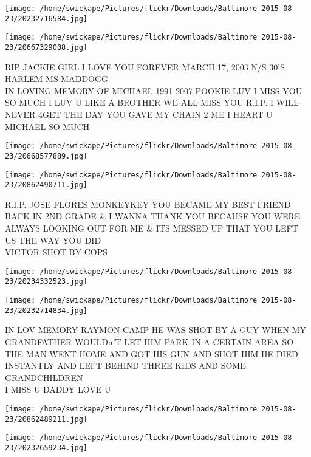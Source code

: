 \documentclass[10pt,letterpaper]{article}
\begin{document}
\texttt{[image: /home/swickape/Pictures/flickr/Downloads/Baltimore 2015-08-23/20232716584.jpg]}

\vspace{0.25in}
\texttt{[image: /home/swickape/Pictures/flickr/Downloads/Baltimore 2015-08-23/20667329008.jpg]}

RIP JACKIE GIRL I LOVE YOU FOREVER MARCH 17, 2003 N/S 30'S HARLEM MS MADDOGG\\
IN LOVING MEMORY OF MICHAEL 1991{-}2007 POOKIE LUV I MISS YOU SO MUCH I LUV U LIKE A BROTHER WE ALL MISS YOU R.I.P. I WILL NEVER 4GET THE DAY YOU GAVE MY CHAIN 2 ME I HEART U MICHAEL SO MUCH\\
\pagebreak

\texttt{[image: /home/swickape/Pictures/flickr/Downloads/Baltimore 2015-08-23/20668577889.jpg]}

\vspace{0.25in}
\texttt{[image: /home/swickape/Pictures/flickr/Downloads/Baltimore 2015-08-23/20862490711.jpg]}

R.I.P. JOSE FLORES MONKEYKEY YOU BECAME MY BEST FRIEND BACK IN 2ND GRADE \& I WANNA THANK YOU BECAUSE YOU WERE ALWAYS LOOKING OUT FOR ME \& ITS MESSED UP THAT YOU LEFT US THE WAY YOU DID\\
VICTOR SHOT BY COPS\\
\pagebreak

\texttt{[image: /home/swickape/Pictures/flickr/Downloads/Baltimore 2015-08-23/20234332523.jpg]}

\vspace{0.25in}
\texttt{[image: /home/swickape/Pictures/flickr/Downloads/Baltimore 2015-08-23/20232714834.jpg]}

IN LOV MEMORY RAYMON CAMP HE WAS SHOT BY A GUY WHEN MY GRANDFATHER WOULDn'T LET HIM PARK IN A CERTAIN AREA SO THE MAN WENT HOME AND GOT HIS GUN AND SHOT HIM HE DIED INSTANTLY AND LEFT BEHIND THREE KIDS AND SOME GRANDCHILDREN\\
I MISS U DADDY LOVE U\\
\pagebreak

\texttt{[image: /home/swickape/Pictures/flickr/Downloads/Baltimore 2015-08-23/20862489211.jpg]}

\vspace{0.25in}
\texttt{[image: /home/swickape/Pictures/flickr/Downloads/Baltimore 2015-08-23/20232659234.jpg]}
\end{document}
